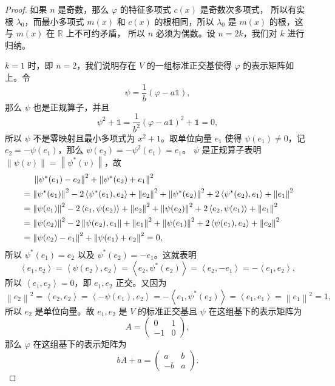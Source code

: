 \documentclass[fontset=none,zihao=-4]{Notes}
\newcommand{\inn}[1]{\left\langle#1\right\rangle}
\newcommand{\norm}[1]{\left\lVert#1\right\rVert}
\begin{document}
\begin{proof}
  如果 $n$ 是奇数，那么 $\varphi$ 的特征多项式 $c(x)$ 是奇数次多项式，
  所以有实根 $\lambda_0$，而最小多项式 $m(x)$ 和 $c(x)$ 的根相同，所以
  $\lambda_0$ 是 $m(x)$ 的根，这与 $m(x)$ 在 $\mathbb{R}$ 上不可约矛盾，
  所以 $n$ 必须为偶数。设 $n=2k$，我们对 $k$ 进行归纳。

  $k=1$ 时，即 $n=2$，我们说明存在 $V$ 的一组标准正交基使得
  $\varphi$ 的表示矩阵如上。令
  \[
    \psi=\frac{1}{b}(\varphi-a\mathbb{1}),
  \]
  那么 $\psi$ 也是正规算子，并且
  \[
    \psi^2+\mathbb{1}=\frac{1}{b^2}(\varphi-a\mathbb{1})^2+\mathbb{1} 
    =0, 
  \]
  所以 $\psi$ 不是零映射且最小多项式为 $x^2+1$。取单位向量 $e_1$ 使得
  $\psi(e_1)\neq 0$，记 $e_2=-\psi(e_1)$，那么 $\psi(e_2)=-\psi^2(e_1)=e_1$。
  $\psi$ 是正规算子表明 $\norm{\psi(v)}=\norm{\psi^*(v)}$，故
  \begin{align*}
    &\hphantom{{}={}}\norm{\psi^*(e_1)-e_2}^2+\norm{\psi^*(e_2)+e_1}^2\\
    &=\norm{\psi^*(e_1)}^2-2\inn{\psi^*(e_1),e_2}+\norm{e_2}^2+
    \norm{\psi^*(e_2)}^2+2\inn{\psi^*(e_2),e_1}+\norm{e_1}^2\\
    &=\norm{\psi(e_1)}^2-2\inn{e_1,\psi(e_2)}+\norm{e_2}^2+
    \norm{\psi(e_2)}^2+2\inn{e_2,\psi(e_1)}+\norm{e_1}^2\\
    &=\norm{\psi(e_2)}^2-2\norm{\psi(e_2),e_1}+\norm{e_1}^2+
    \norm{\psi(e_1)}^2+2\inn{\psi(e_1),e_2}+\norm{e_2}^2\\
    &=\norm{\psi(e_2)-e_1}^2+\norm{\psi(e_1)+e_2}^2 =0,
  \end{align*}
  所以 $\psi^*(e_1)=e_2$ 以及 $\psi^*(e_2)=-e_1$。这就表明
  \[
    \inn{e_1,e_2}=\inn{\psi(e_2),e_2}=\inn{e_2,\psi^*(e_2)}=\inn{e_2,-e_1}
    =-\inn{e_1,e_2},  
  \]
  所以 $\inn{e_1,e_2}=0$，即 $e_1,e_2$ 正交。又因为
  \[
    \norm{e_2}^2=\inn{e_2,e_2}=\inn{-\psi(e_1),e_2}=-\inn{e_1,\psi^*(e_2)}
    =\inn{e_1,e_1}=\norm{e_1}^2=1,  
  \]
  所以 $e_2$ 是单位向量。故 $e_1,e_2$ 是 $V$ 的标准正交基且 $\psi$
  在这组基下的表示矩阵为
  \[
    A=\begin{pmatrix}
      0 & 1 \\
      -1 & 0
    \end{pmatrix}  ,
  \]
  那么 $\varphi$ 在这组基下的表示矩阵为
  \[
    bA+a=\begin{pmatrix}
      a & b \\
      -b & a
    \end{pmatrix}  .
  \]


\end{proof}
\end{document}
